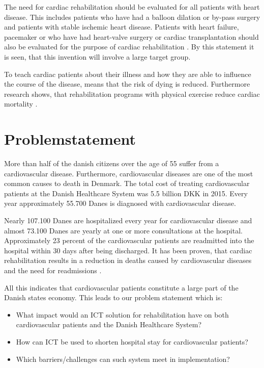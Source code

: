 The need for cardiac rehabilitation should be evaluated for all patients with heart disease. This includes patients who have had a balloon dilation or by-pass surgery and patients with stable ischemic heart disease.
Patients with heart failure, pacemaker or who have had heart-valve surgery or cardiac transplantation should also be evaluated for the purpose of cardiac rehabilitation \cite{Rehabilitering}. By this statement it is seen, that this invention will involve a large target group. 

To teach cardiac patients about their illness and how they are able to influence the course of the disease, means that the risk of dying is reduced. Furthermore research shows, that rehabilitation programs with physical exercise reduce cardiac mortality \cite{Hjerteforening}.    


\section{Problemstatement}
More than half of the danish citizens over the age of 55 suffer from a cardiovascular disease. Furthermore, cardiovascular diseases are one of the most common causes to death in Denmark. The total cost of treating cardiovascular patients at the Danish Healthcare System was 5.5 billion DKK in 2015. Every year approximately 55.700 Danes is diagnosed with cardiovascular disease.   

Nearly 107.100 Danes are hospitalized every year for cardiovascular disease and almost 73.100 Danes are yearly at one or more consultations at the hospital. Approximately 23 percent of the cardiovascular patients are readmitted into the hospital within 30 days after being discharged. It has been proven, that cardiac rehabilitation results in a reduction in deaths caused by cardiovascular diseases and the need for readmissions \cite{Hjerteforening}.

All this indicates that cardiovascular patients constitute a large part of the Danish states economy. This leads to our problem statement which is:

\begin{itemize}
	\item What impact would an ICT solution for rehabilitation have on both cardiovascular patients and the Danish Healthcare System?
	\item How can ICT be used to shorten hospital stay for cardiovascular patients?
	\item Which barriers/challenges can such system meet in implementation?
\end{itemize}

